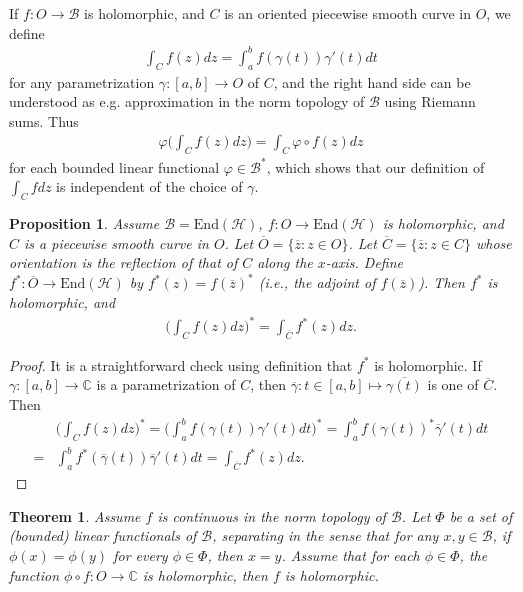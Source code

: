 \documentclass[12pt,b5paper,notitlepage]{article}
\theoremstyle{definition}
\theoremstyle{plain}
\newtheorem{thm}[df]{Theorem}
\newtheorem{pp}[df]{Proposition}
\newcommand{\mc}{\mathcal}
\newcommand{\ovl}{\overline}
\newcommand{\End}{\mathrm{End}} %
\newcommand{\Cbb}{\mathbb C}
\numberwithin{equation}{section}
\begin{document}
If $f:O\rightarrow\mc B$ is holomorphic, and $C$ is an oriented piecewise smooth curve in $O$, we define
\begin{align}
\int_C f(z)dz=\int_a^b f(\gamma(t))\gamma'(t)dt	
\end{align}
for any parametrization $\gamma:[a,b]\rightarrow O$ of $C$, and the right hand side can be understood as e.g. approximation in the norm topology of $\mc B$ using Riemann sums. Thus 
\begin{align*}
\varphi\Big(\int_Cf(z)dz\Big)=\int_C \varphi\circ f(z)dz
\end{align*}
for each bounded linear functional $\varphi\in\mc B^*$, which shows that our definition of $\int_Cfdz$ is independent of the choice of $\gamma$.


\begin{pp}\label{lb57}
	Assume $\mc B=\End(\mc H)$, $f:O\rightarrow\End(\mc H)$ is holomorphic, and $C$ is a piecewise smooth curve in $O$. Let $\ovl O=\{\ovl z:z\in O\}$. Let $\ovl C=\{\ovl z:z\in C\}$ whose orientation is the reflection of that of $C$ along the $x$-axis. Define $f^*:\ovl O\rightarrow\End(\mc H)$ by $f^*(z)=f(\ovl z)^*$ (i.e., the adjoint of $f(\ovl z)$). Then $f^*$ is holomorphic, and
	\begin{align}
		\Big(\int_C f(z)dz \Big)^*=\int_{\ovl C} f^*(z)dz.	
	\end{align}
\end{pp}


\begin{proof}
It is a straightforward check using definition that $f^*$ is holomorphic. If $\gamma:[a,b]\rightarrow\Cbb$ is a parametrization of $C$, then $\ovl \gamma:t\in[a,b]\mapsto \ovl{\gamma(t)}$ is one of $\ovl C$. Then
\begin{align*}
&\Big(\int_C f(z)dz \Big)^*=\Big(\int_a^b f(\gamma(t))\gamma'(t)dt \Big)^*=\int_a^b f(\gamma(t))^*\ovl\gamma'(t)dt\\
=&\int_a^b f^*(\ovl\gamma(t))\ovl\gamma'(t)dt=\int_{\ovl C} f^*(z)dz.
\end{align*}
\end{proof}



\begin{thm}\label{lb56}
Assume $f$ is continuous in the norm topology of $\mc B$. Let $\Phi$ be a set of (bounded) linear functionals of $\mc B$, separating in the sense that for any $x,y\in\mc B$, if $\phi(x)=\phi(y)$ for every $\phi\in\Phi$, then $x=y$. Assume that for each $\phi\in\Phi$, the function $\phi\circ f:O\rightarrow\Cbb$ is holomorphic, then $f$ is holomorphic.
\end{thm}
\end{document}

